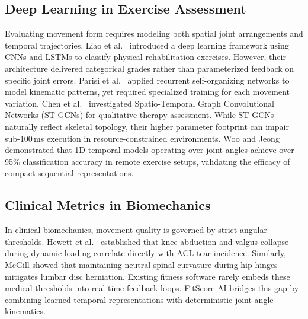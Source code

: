 \documentclass[conference]{IEEEtran}
\begin{document}
\subsection{Deep Learning in Exercise Assessment}
Evaluating movement form requires modeling both spatial joint arrangements and temporal trajectories. Liao et al.\ \cite{liao2020deep} introduced a deep learning framework using CNNs and LSTMs \cite{hochreiter1997long} to classify physical rehabilitation exercises. However, their architecture delivered categorical grades rather than parameterized feedback on specific joint errors. Parisi et al.\ \cite{parisi2015human} applied recurrent self-organizing networks to model kinematic patterns, yet required specialized training for each movement variation. Chen et al.\ \cite{chen2021action} investigated Spatio-Temporal Graph Convolutional Networks (ST-GCNs) for qualitative therapy assessment. While ST-GCNs naturally reflect skeletal topology, their higher parameter footprint can impair sub-100\,ms execution in resource-constrained environments. Woo and Jeong \cite{woo2024exercise} demonstrated that 1D temporal models operating over joint angles achieve over 95\% classification accuracy in remote exercise setups, validating the efficacy of compact sequential representations.

\subsection{Clinical Metrics in Biomechanics}
In clinical biomechanics, movement quality is governed by strict angular thresholds. Hewett et al.\ \cite{hewett2005biomechanical} established that knee abduction and valgus collapse during dynamic loading correlate directly with ACL tear incidence. Similarly, McGill \cite{mcgill2007low} showed that maintaining neutral spinal curvature during hip hinges mitigates lumbar disc herniation. Existing fitness software rarely embeds these medical thresholds into real-time feedback loops. FitScore AI bridges this gap by combining learned temporal representations with deterministic joint angle kinematics.
\end{document}
